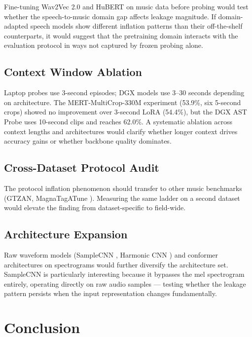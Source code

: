\documentclass[conference]{IEEEtran}
\begin{document}
Fine-tuning Wav2Vec 2.0 and HuBERT on music data before probing would
test whether the speech-to-music domain gap affects leakage magnitude.
If domain-adapted speech models show different inflation patterns than
their off-the-shelf counterparts, it would suggest that the pretraining
domain interacts with the evaluation protocol in ways not captured by
frozen probing alone.

\subsection{Context Window
Ablation}\label{b.-context-window-ablation}

Laptop probes use 3-second episodes; DGX models use 3--30 seconds
depending on architecture. The MERT-MultiCrop-330M experiment (53.9\%,
six 5-second crops) showed no improvement over 3-second LoRA (54.4\%),
but the DGX AST Probe uses 10-second clips and reaches 62.0\%. A
systematic ablation across context lengths and architectures would
clarify whether longer context drives accuracy gains or whether backbone
quality dominates.

\subsection{Cross-Dataset Protocol
Audit}\label{c.-cross-dataset-protocol-audit}

The protocol inflation phenomenon should transfer to other music
benchmarks (GTZAN, MagnaTagATune \citep{law2009magnatag}). Measuring the
same ladder on a second dataset would elevate the finding from
dataset-specific to field-wide.

\subsection{Architecture Expansion}\label{d.-architecture-expansion}

Raw waveform models (SampleCNN \citep{lee2018samplecnn}, Harmonic CNN
\citep{won2020harmonic}) and conformer architectures
\citep{gulati2020conformer} on spectrograms would further diversify the
architecture set. SampleCNN is particularly interesting because it
bypasses the mel spectrogram entirely, operating directly on raw audio
samples --- testing whether the leakage pattern persists when the
input representation changes fundamentally.

\section{Conclusion}\label{conclusion}
\end{document}

